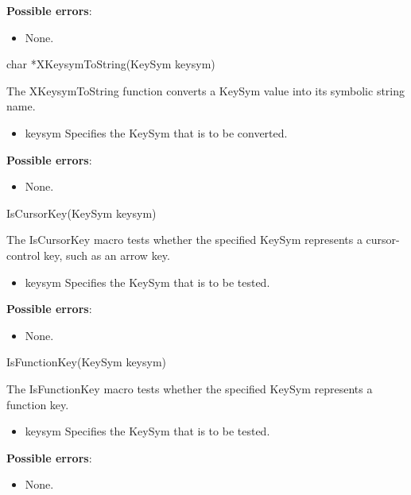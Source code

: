 \documentclass{report}
\begin{document}
\begin{itemize}
        \textbf{Possible errors}:
        \begin{itemize}
            \item None.
        \end{itemize}

        \begin{cppcode}
        char *XKeysymToString(KeySym keysym)
        \end{cppcode}
        \bigbreak \noindent
        The XKeysymToString function converts a KeySym value into its symbolic string name.
        \begin{itemize}
            \item keysym Specifies the KeySym that is to be converted.
        \end{itemize}

        \textbf{Possible errors}:
        \begin{itemize}
            \item None.
        \end{itemize}

        \begin{cppcode}
        IsCursorKey(KeySym keysym)
        \end{cppcode}
        \bigbreak \noindent
        The IsCursorKey macro tests whether the specified KeySym represents a cursor-control key, such as an arrow key.
        \begin{itemize}
            \item keysym Specifies the KeySym that is to be tested.
        \end{itemize}

        \textbf{Possible errors}:
        \begin{itemize}
            \item None.
        \end{itemize}

        \begin{cppcode}
        IsFunctionKey(KeySym keysym)
        \end{cppcode}
        \bigbreak \noindent
        The IsFunctionKey macro tests whether the specified KeySym represents a function key.
        \begin{itemize}
            \item keysym Specifies the KeySym that is to be tested.
        \end{itemize}

        \textbf{Possible errors}:
        \begin{itemize}
            \item None.
        \end{itemize}


\end{itemize}
\end{document}
